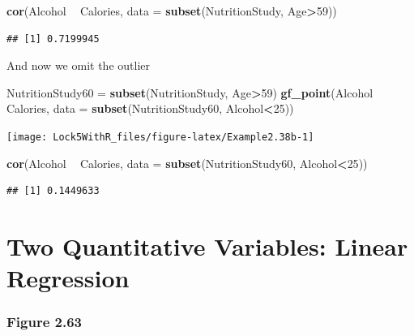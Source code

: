 \documentclass[]{book}
\newenvironment{Shaded}{\begin{snugshade}}{\end{snugshade}}
\newcommand{\DataTypeTok}[1]{\textcolor[rgb]{0.13,0.29,0.53}{#1}}
\newcommand{\DecValTok}[1]{\textcolor[rgb]{0.00,0.00,0.81}{#1}}
\newcommand{\KeywordTok}[1]{\textcolor[rgb]{0.13,0.29,0.53}{\textbf{#1}}}
\newcommand{\NormalTok}[1]{#1}
\newcommand{\OperatorTok}[1]{\textcolor[rgb]{0.81,0.36,0.00}{\textbf{#1}}}
\newcommand{\StringTok}[1]{\textcolor[rgb]{0.31,0.60,0.02}{#1}}
\begin{document}
\begin{Shaded}
\begin{Highlighting}[]
\KeywordTok{cor}\NormalTok{(Alcohol }\OperatorTok{~}\StringTok{ }\NormalTok{Calories, }\DataTypeTok{data =} \KeywordTok{subset}\NormalTok{(NutritionStudy, Age}\OperatorTok{>}\DecValTok{59}\NormalTok{))}
\end{Highlighting}
\end{Shaded}

\begin{verbatim}
## [1] 0.7199945
\end{verbatim}

And now we omit the outlier

\begin{Shaded}
\begin{Highlighting}[]
\NormalTok{NutritionStudy60 =}\StringTok{ }\KeywordTok{subset}\NormalTok{(NutritionStudy, Age}\OperatorTok{>}\DecValTok{59}\NormalTok{)}
\KeywordTok{gf_point}\NormalTok{(Alcohol }\OperatorTok{~}\StringTok{ }\NormalTok{Calories, }\DataTypeTok{data =} \KeywordTok{subset}\NormalTok{(NutritionStudy60, Alcohol}\OperatorTok{<}\DecValTok{25}\NormalTok{))}
\end{Highlighting}
\end{Shaded}

\texttt{[image: Lock5WithR\_files/figure-latex/Example2.38b-1]}

\begin{Shaded}
\begin{Highlighting}[]
\KeywordTok{cor}\NormalTok{(Alcohol }\OperatorTok{~}\StringTok{ }\NormalTok{Calories, }\DataTypeTok{data =} \KeywordTok{subset}\NormalTok{(NutritionStudy60, Alcohol}\OperatorTok{<}\DecValTok{25}\NormalTok{))}
\end{Highlighting}
\end{Shaded}

\begin{verbatim}
## [1] 0.1449633
\end{verbatim}

\hypertarget{two-quantitative-variables-linear-regression}{%
\section{Two Quantitative Variables: Linear Regression}\label{two-quantitative-variables-linear-regression}}

\hypertarget{figure-2.63}{%
\subsubsection{Figure 2.63}\label{figure-2.63}}
\end{document}
